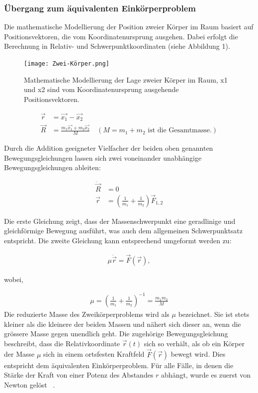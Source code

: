 \documentclass[a4paper,12pt,twoside]{article}
\begin{document}
\subsubsection{Übergang zum äquivalenten Einkörperproblem}
Die mathematische Modellierung der Position zweier Körper im Raum basiert auf Positionsvektoren, die vom Koordinatenursprung ausgehen. Dabei erfolgt die Berechnung in Relativ- und Schwerpunktkoordinaten (siehe Abbildung 1).

\begin{figure}[H]
	\centering
	\texttt{[image: Zwei-Körper.png]}
	\caption[Eintrag in Abbildungsverzeichnis von Grumpy Cat]{Mathematische Modellierung der Lage zweier Körper im Raum, x1 und x2 sind vom Koordinatenursprung ausgehende Positionsvektoren.}
	\label{Zwei-Körper .}
\end{figure}

\begin{align*}
	\vec{r} &= \vec{x_1} - \vec{x_2} \\
	\vec{R} &= \frac{m_1 \vec{x_1} + m_2 \vec{x_2}}{M} \quad (M = m_1 + m_2 \text{ ist die Gesamtmasse.})
\end{align*}

Durch die Addition geeigneter Vielfacher der beiden oben genannten Bewegungsgleichungen lassen sich zwei voneinander unabhängige Bewegungsgleichungen ableiten:

\begin{align*}
	\ddot{\vec{R}} &= 0 \\
	\vec{r} &= \left( \frac{1}{m_1} + \frac{1}{m_2} \right) \vec{F}_{1,2}
\end{align*}

Die erste Gleichung zeigt, dass der Massenschwerpunkt eine geradlinige und gleichförmige Bewegung ausführt, was auch dem allgemeinen Schwerpunktsatz entspricht. Die zweite Gleichung kann entsprechend umgeformt werden zu:

\begin{align*}
\mu \ddot{\vec{r}} = \vec{F}(\vec{r}),
\end{align*}

wobei,

\begin{align*}
\mu = \left( \frac{1}{m_1} + \frac{1}{m_2} \right)^{-1} = \frac{m_1 m_2}{M}
\end{align*}
Die reduzierte Masse des Zweikörperproblems wird als $\mu$ bezeichnet. Sie ist stets kleiner als die kleinere der beiden Massen und nähert sich dieser an, wenn die grössere Masse gegen unendlich geht. Die zugehörige Bewegungsgleichung beschreibt, dass die Relativkoordinate $\vec{r}(t)$ sich so verhält, als ob ein Körper der Masse $\mu$ sich in einem ortsfesten Kraftfeld $\vec{F}(\vec{r})$ bewegt wird. Dies entspricht dem äquivalenten Einkörperproblem. Für alle Fälle, in denen die Stärke der Kraft von einer Potenz des Abstandes $r$ abhängt, wurde es zuerst von Newton gelöst ~\cite{Gleisner2013}.
\end{document}
